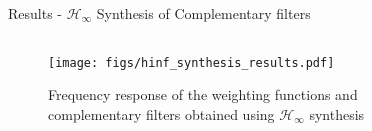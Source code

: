 \documentclass[t]{clean-beamer}
\begin{document}
\begin{frame}[label={sec:org7b86e36}]{Results - \(\mathcal{H}_\infty\) Synthesis of Complementary filters}
\begin{columns}
\begin{column}{0.6\columnwidth}
\begin{figure}[htbp]
\centering
\texttt{[image: figs/hinf\_synthesis\_results.pdf]}
\caption{Frequency response of the weighting functions and complementary filters obtained using \(\mathcal{H}_\infty\) synthesis}
\end{figure}
\end{column}

\begin{column}{0.4\columnwidth}
\end{column}
\end{columns}
\end{frame}
\end{document}
